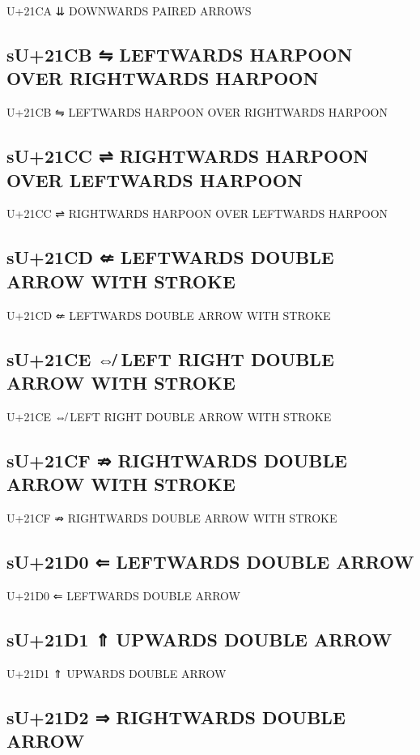 U+21CA ⇊ DOWNWARDS PAIRED ARROWS

\subsection{sU+21CB ⇋ LEFTWARDS HARPOON OVER RIGHTWARDS HARPOON}

U+21CB ⇋ LEFTWARDS HARPOON OVER RIGHTWARDS HARPOON

\subsection{sU+21CC ⇌ RIGHTWARDS HARPOON OVER LEFTWARDS HARPOON}

U+21CC ⇌ RIGHTWARDS HARPOON OVER LEFTWARDS HARPOON

\subsection{sU+21CD ⇍ LEFTWARDS DOUBLE ARROW WITH STROKE}

U+21CD ⇍ LEFTWARDS DOUBLE ARROW WITH STROKE

\subsection{sU+21CE ⇎ LEFT RIGHT DOUBLE ARROW WITH STROKE}

U+21CE ⇎ LEFT RIGHT DOUBLE ARROW WITH STROKE

\subsection{sU+21CF ⇏ RIGHTWARDS DOUBLE ARROW WITH STROKE}

U+21CF ⇏ RIGHTWARDS DOUBLE ARROW WITH STROKE

\subsection{sU+21D0 ⇐ LEFTWARDS DOUBLE ARROW}

U+21D0 ⇐ LEFTWARDS DOUBLE ARROW

\subsection{sU+21D1 ⇑ UPWARDS DOUBLE ARROW}

U+21D1 ⇑ UPWARDS DOUBLE ARROW

\subsection{sU+21D2 ⇒ RIGHTWARDS DOUBLE ARROW}

